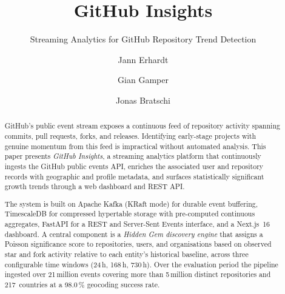 \documentclass[sigconf]{acmart}
\begin{document}

\title{GitHub Insights}
\subtitle{Streaming Analytics for GitHub Repository Trend Detection}

\author{Jann Erhardt}

\author{Gian Gamper}

\author{Jonas Bratschi}

\renewcommand{\shortauthors}{Erhardt, Gamper, Bratschi}

\begin{abstract}
GitHub's public event stream exposes a continuous feed of repository activity
spanning commits, pull requests, forks, and releases. Identifying early-stage
projects with genuine momentum from this feed is impractical without automated
analysis. This paper presents \textit{GitHub Insights}, a streaming
analytics platform that continuously ingests the GitHub public events API,
enriches the associated user and repository records with geographic and profile
metadata, and surfaces statistically significant growth trends through a web
dashboard and REST API.

The system is built on Apache Kafka (KRaft mode) for durable event buffering,
TimescaleDB for compressed hypertable storage with pre-computed continuous
aggregates, FastAPI for a REST and Server-Sent Events interface, and a
Next.js~16 dashboard. A central component is a \emph{Hidden Gem discovery
engine} that assigns a Poisson significance score to repositories, users, and
organisations based on observed star and fork activity relative to each
entity's historical baseline, across three configurable time windows
(24\,h, 168\,h, 730\,h). Over the evaluation period the pipeline ingested
over 21\,million events covering more than 5\,million distinct repositories
and 217~countries at a 98.0\,\% geocoding success rate.
\end{abstract}
\end{document}
